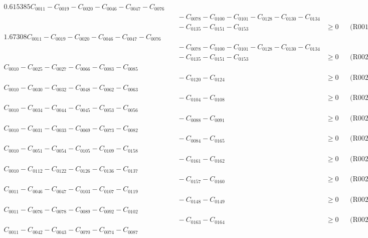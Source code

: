 \documentclass[a4paper,10pt]{article}
\begin{document}
\allowdisplaybreaks
{\small\begin{align}
0.615385C_{0011} - C_{0019} - C_{0020} - C_{0046} - C_{0047} - C_{0076} \\[0.5ex]
&\quad  - C_{0078} - C_{0100} - C_{0101} - C_{0128} - C_{0130} - C_{0134} \\[0.5ex]
&\quad  - C_{0135} - C_{0151} - C_{0153} &\geq 0 && \text{(R0019)} \\
1.67308C_{0011} - C_{0019} - C_{0020} - C_{0046} - C_{0047} - C_{0076} \\[0.5ex]
&\quad  - C_{0078} - C_{0100} - C_{0101} - C_{0128} - C_{0130} - C_{0134} \\[0.5ex]
&\quad  - C_{0135} - C_{0151} - C_{0153} &\geq 0 && \text{(R0020)} \\
C_{0010} - C_{0025} - C_{0027} - C_{0066} - C_{0083} - C_{0085} \\[0.5ex]
&\quad  - C_{0120} - C_{0124} &\geq 0 && \text{(R0021)} \\
C_{0010} - C_{0030} - C_{0032} - C_{0048} - C_{0062} - C_{0063} \\[0.5ex]
&\quad  - C_{0104} - C_{0108} &\geq 0 && \text{(R0022)} \\
C_{0010} - C_{0034} - C_{0044} - C_{0045} - C_{0053} - C_{0056} \\[0.5ex]
&\quad  - C_{0088} - C_{0091} &\geq 0 && \text{(R0023)} \\
C_{0010} - C_{0031} - C_{0033} - C_{0069} - C_{0073} - C_{0082} \\[0.5ex]
&\quad  - C_{0084} - C_{0165} &\geq 0 && \text{(R0024)} \\
C_{0010} - C_{0051} - C_{0054} - C_{0105} - C_{0109} - C_{0158} \\[0.5ex]
&\quad  - C_{0161} - C_{0162} &\geq 0 && \text{(R0025)} \\
C_{0010} - C_{0112} - C_{0122} - C_{0126} - C_{0136} - C_{0137} \\[0.5ex]
&\quad  - C_{0157} - C_{0160} &\geq 0 && \text{(R0026)} \\
C_{0011} - C_{0046} - C_{0047} - C_{0103} - C_{0107} - C_{0119} \\[0.5ex]
&\quad  - C_{0148} - C_{0149} &\geq 0 && \text{(R0027)} \\
C_{0011} - C_{0076} - C_{0078} - C_{0089} - C_{0092} - C_{0102} \\[0.5ex]
&\quad  - C_{0163} - C_{0164} &\geq 0 && \text{(R0028)} \\
C_{0011} - C_{0042} - C_{0043} - C_{0070} - C_{0074} - C_{0087} \\[0.5ex]

\end{align}}
\end{document}
